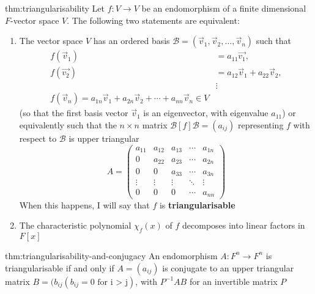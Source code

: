 \documentclass{article}
\begin{document}
\begin{thm}[Triangularisability]{thm:triangularisability}{}
    Let $f : V \to V$ be an endomorphism of a finite dimensional $F$-vector space $V$. The following two statements are equivalent:
    \begin{enumerate}
        \item The vector space $V$ has an ordered basis $\mathcal{B} = (\vec{v}_{1}, \vec{v}_{2},\dots,\vec{v}_{n})$ such that
            \begin{align*}
                f(\vec{v}_{1}) &= a_{11}\vec{v_{1}}, \\
                f(\vec{v_{2}}) &= a_{12}\vec{v}_{1} + a_{22}\vec{v}_{2}, \\
                &\vdots \\
                f(\vec{v}_{n}) = a_{1n}\vec{v}_{1} + a_{2n}\vec{v}_{2} + \cdots + a_{nn}\vec{v}_{n}\in V
            \end{align*}
            (so that the first basis vector $\vec{v}_{1}$ is an eigenvector, with eigenvalue $a_{11}$) or equivalently such that the $n \times n$ matrix $\mathcal{B}[f]\mathcal{B} = (a_{ij})$ representing $f$ with respect to $\mathcal{B}$ is upper triangular
            \[A = \begin{pmatrix}
                a_{11}& a_{12}& a_{13}& \cdots & a_{1n} \\
                0& a_{22}& a_{23}& \cdots& a_{2n} \\
                0 & 0& a_{33}& \cdots& a_{3n} \\
                \vdots& \vdots& \vdots& \ddots& \vdots \\
                0 & 0& 0& \cdots& a_{nn}
            \end{pmatrix}\]
            When this happens, I will say that $f$ is \textbf{triangularisable}
        \item The characteristic polynomial $\chi_{f}(x)$ of $f$ decomposes into linear factors in $F[x]$
    \end{enumerate}
\end{thm}

\begin{thm}[]{thm:triangularisability-and-conjugacy}{}
    An endomorphism $A : F^{n} \to F^{n}$ is triangularisable if and only if $A = (a_{ij})$ is conjugate to an upper triangular matrix $B = (b_{ij}(b_{ij} = 0 \text{ for i > j})$, with $P^{-1} AB$ for an invertible matrix $P$
\end{thm}
\end{document}
